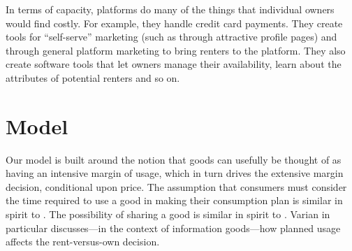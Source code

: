 \documentclass[11pt]{article}
\begin{document}
In terms of capacity, platforms do many of the things that individual owners would find costly. 
For example, they handle credit card payments. 
They create tools for ``self-serve'' marketing (such as through attractive profile pages) and through general platform marketing to bring renters to the platform. 
They also create software tools that let owners manage their availability, learn about the attributes of potential renters and so on. 



\section{Model}
Our model is built around the notion that goods can usefully be thought of as having an intensive margin of usage, which in turn drives the extensive margin decision, conditional upon price. 
The assumption that consumers must consider the time required to use a good in making their consumption plan is similar in spirit to \cite{becker1965theory}.
The possibility of sharing a good is similar in spirit to \cite{varian2000}.
Varian in particular discusses---in the context of information goods---how planned usage affects the rent-versus-own decision. 
\end{document}
